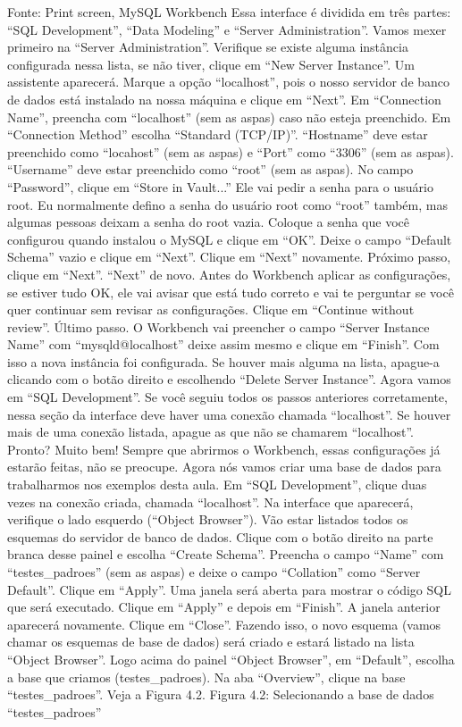Fonte: Print screen, MySQL Workbench
Essa interface é dividida em três partes: “SQL Development”, “Data Modeling” e “Server Administration”. Vamos mexer primeiro na “Server Administration”. Verifique se existe alguma instância configurada nessa lista, se não tiver, clique em “New Server Instance”. Um assistente aparecerá. Marque a opção “localhost”, pois o nosso servidor de banco de dados está instalado na nossa máquina e clique em “Next”. Em “Connection Name”, preencha com “localhost” (sem as aspas) caso não esteja preenchido. Em “Connection Method” escolha “Standard (TCP/IP)”. “Hostname” deve estar preenchido como “locahost” (sem as aspas) e “Port” como “3306” (sem as aspas). “Username” deve estar preenchido como “root” (sem as aspas). No campo “Password”, clique em “Store in Vault...” Ele vai pedir a senha para o usuário root. Eu normalmente defino a senha do usuário root como “root” também, mas algumas pessoas deixam a senha do root vazia. Coloque a senha que você configurou quando instalou o MySQL e clique em “OK”. Deixe o campo “Default Schema” vazio e clique em “Next”. Clique em “Next” novamente. Próximo passo, clique em “Next”. “Next” de novo. Antes do Workbench aplicar as configurações, se estiver tudo OK, ele vai avisar que está tudo correto e vai te perguntar se você quer continuar sem revisar as configurações. Clique em “Continue without review”. Último passo. O Workbench vai preencher o campo “Server Instance Name” com “mysqld@localhost” deixe assim mesmo e clique em “Finish”. Com isso a nova instância foi configurada. Se houver mais alguma na lista, apague-a clicando com o botão direito e escolhendo “Delete Server Instance”.
Agora vamos em “SQL Development”. Se você seguiu todos os passos anteriores corretamente, nessa seção da interface deve haver uma conexão chamada “localhost”. Se houver mais de uma conexão listada, apague as que não se chamarem “localhost”. Pronto? Muito bem! Sempre que abrirmos o Workbench, essas configurações já estarão feitas, não se preocupe. Agora nós vamos criar uma base de dados para trabalharmos nos exemplos desta aula.
Em “SQL Development”, clique duas vezes na conexão criada, chamada “localhost”. Na interface que aparecerá, verifique o lado esquerdo (“Object Browser”). Vão estar listados todos os esquemas do servidor de banco de dados. Clique com o botão direito na parte branca desse painel e escolha “Create Schema”. Preencha o campo “Name” com “testes\_padroes” (sem as aspas) e deixe o campo “Collation” como “Server Default”. Clique em “Apply”. Uma janela será aberta para mostrar o código SQL que será executado. Clique em “Apply” e depois em “Finish”. A janela anterior aparecerá novamente. Clique em “Close”. Fazendo isso, o novo esquema (vamos chamar os esquemas de base de dados) será criado e estará listado na lista “Object Browser”. 
Logo acima do painel “Object Browser”, em “Default”, escolha a base que criamos (testes\_padroes). Na aba “Overview”, clique na base “testes\_padroes”. Veja a Figura 4.2.
Figura 4.2: Selecionando a base de dados “testes\_padroes”
 
